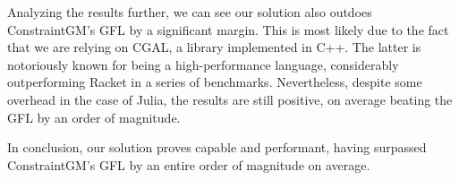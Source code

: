 Analyzing the results further, we can see our solution also outdoes
ConstraintGM's \ac{GFL} by a significant margin.  This is most likely due to the
fact that we are relying on \ac{CGAL}, a library implemented in C++.  The latter
is notoriously known for being a high-performance language, considerably
outperforming Racket in a series of benchmarks.  Nevertheless, despite some
overhead in the case of Julia, the results are still positive, on average
beating the \ac{GFL} by an order of magnitude.

In conclusion, our solution proves capable and performant, having surpassed
ConstraintGM's \ac{GFL} by an entire order of magnitude on average.
